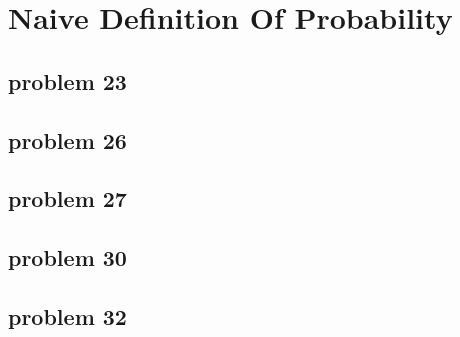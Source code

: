 \section{Naive Definition Of Probability}

\subsection{problem 23}


\subsection{problem 26}


\subsection{problem 27}


\subsection{problem 30}


\subsection{problem 32}

